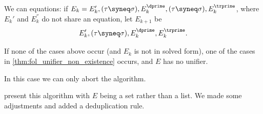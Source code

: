 \begin{algorithm}
\begin{thmenum}
     We can  equations: if \( E_k = E_k', (\tau \syneq \sigma), E_k^\dprime, (\tau \syneq \sigma), E_k^\trprime \), where \( E_k' \) and \( E_k^\dprime \) do not share an equation, let \( E_{k+1} \) be
    \begin{equation*}
      E_k', (\tau \syneq \sigma), E_k^\dprime, E_k^\trprime.
    \end{equation*}

     If none of the cases above occur (and \( E_k \) is not in solved form), one of the cases in \cref{thm:fol_unifier_non_existence} occurs, and \( E \) has no unifier.

    In this case we can only abort the algorithm.
  \end{thmenum}
\end{algorithm}
\begin{comments}
  \item {} present this algorithm with \( E \) being a set rather than a list. We made some adjustments and added a deduplication rule.
\end{comments}
